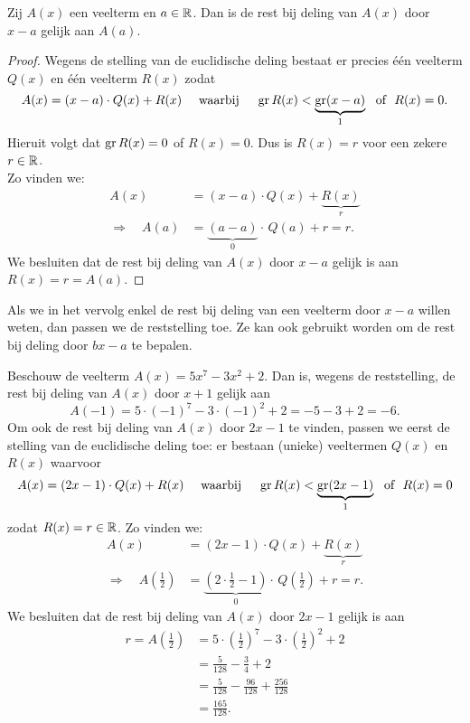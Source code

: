 \documentclass{ximera}
\begin{document}
\begin{stelling}[reststelling]
Zij $A(x)$ een veelterm en $a \in \mathbb{R}$. Dan is de rest bij deling van $A(x)$ door $x-a$ gelijk aan $A(a)$.
\end{stelling}
\begin{proof}
Wegens de stelling van de euclidische deling bestaat er precies  \'e\'en veelterm $Q(x)$ en \'e\'en veelterm $R(x)$ zodat
\[
A(x) = (x-a)\cdot Q(x) + R(x) \quad \text{ waarbij } \quad \operatorname{gr} R(x) < \underbrace{\operatorname{gr} (x-a)}_{1} \,\, \text{ of } \,\, R(x) = 0.
\]
Hieruit volgt dat $\operatorname{gr} R(x) = 0$ of $R(x) = 0$. Dus is $R(x) = r$ voor een zekere $r \in \mathbb{R}$. \\
Zo vinden we:
\begin{align*}
A(x) & = (x-a) \cdot Q(x) + \underbrace{R(x)}_{r} \\
\Rightarrow \quad A(a) & = \underbrace{(a-a)}_{0} \cdot \, Q(a) + r = r. 
\end{align*}
We besluiten dat de rest bij deling van $A(x)$ door $x-a$ gelijk is aan $R(x) = r = A(a)$. 
\end{proof}

Als we in het vervolg enkel de rest bij deling van een veelterm door $x-a$ willen weten, dan passen we de reststelling toe. Ze kan ook gebruikt worden om de rest bij deling door $bx-a$ te bepalen. 

\begin{example}
Beschouw de veelterm $A(x) = 5x^7 - 3x^2 + 2$. Dan is, wegens de reststelling, de rest bij deling van $A(x)$ door $x+1$ gelijk aan
\[
A(-1) = 5 \cdot (-1)^7 - 3 \cdot (-1)^2 + 2 = -5-3+2 = -6.
\]
Om ook de rest bij deling van $A(x)$ door $2x-1$ te vinden, passen we eerst de stelling van de euclidische deling toe: er bestaan (unieke) veeltermen $Q(x)$ en $R(x)$ waarvoor
\[
A(x) = (2x-1)\cdot Q(x) + R(x) \quad \text{ waarbij } \quad \operatorname{gr} R(x) < \underbrace{\operatorname{gr} (2x-1)}_{1} \,\, \text{ of } \,\, R(x) = 0
\]
zodat $R(x) = r \in \mathbb{R}$. Zo vinden we:
\begin{align*}
A(x) & = (2x-1) \cdot Q(x) + \underbrace{R(x)}_{r} \\
\Rightarrow \quad A\left(\frac{1}{2}\right) & = \underbrace{\left(2 \cdot \frac{1}{2}-1\right)}_{0} \cdot \,Q\left(\frac{1}{2}\right) + r = r. 
\end{align*} 
We besluiten dat de rest bij deling van $A(x)$ door $2x-1$ gelijk is aan
\begin{align*}
r = A\left(\frac{1}{2}\right) & = 5 \cdot \left(\frac{1}{2}\right)^7 - 3 \cdot \left(\frac{1}{2}\right)^2 + 2 \\
& = \frac{5}{128} - \frac{3}{4} + 2 \\
& = \frac{5}{128} - \frac{96}{128} + \frac{256}{128} \\
& = \frac{165}{128}.
\end{align*}
\end{example}
\end{document}
